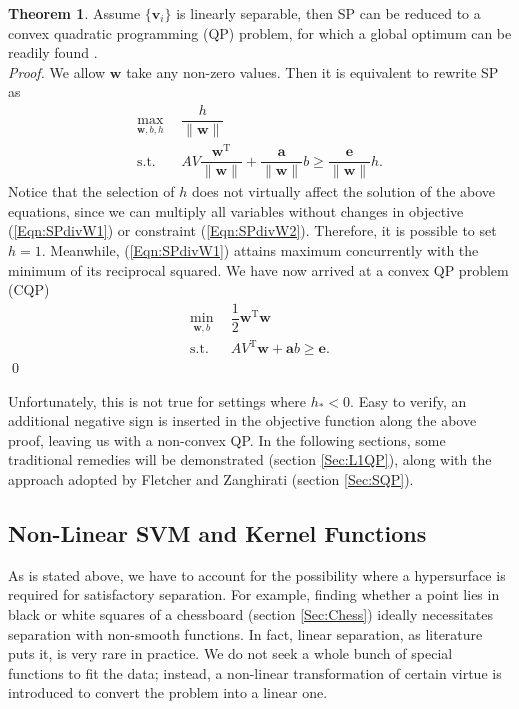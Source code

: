 \documentclass[11pt,a4paper]{article}
\theoremstyle{definition}
\newtheorem{theo}{Theorem}
\renewcommand{\vec}[1]{\boldsymbol{#1}}
\begin{document}
      \begin{theo}\label{Theo:SPcQP}
        Assume $\{\vec{v}_{i}\}$ is linearly separable, then SP can be reduced to a convex quadratic programming (QP) problem, for which a global optimum can be readily found \cite[p.286]{luenberger2008linear}.\\
        \textit{Proof.} We allow $\vec{w}$ take any non-zero values. Then it is equivalent to rewrite SP as
        \begin{align}
          \max_{\vec{w},b,h}~~ & \dfrac{h}{\|\vec{w}\|} \label{Eqn:SPdivW1}\\
           \text{s.t.}~~ & AV\dfrac{\vec{w}^{\mathrm{T}}}{\|\vec{w}\|}+\dfrac{\vec{a}}{\|\vec{w}\|}b\geq\dfrac{\vec{e}}{\|\vec{w}\|}h. \label{Eqn:SPdivW2}
        \end{align}
        Notice that the selection of $h$ does not virtually affect the solution of the above equations, since we can multiply all variables without changes in objective (\ref{Eqn:SPdivW1}) or constraint (\ref{Eqn:SPdivW2}). Therefore, it is possible to set $h=1$. Meanwhile, (\ref{Eqn:SPdivW1}) attains maximum concurrently with the minimum of its reciprocal squared. We have now arrived at a convex QP problem (CQP)
        \begin{align}
          \min_{\vec{w},b}~~ & \dfrac{1}{2}\vec{w}^{\mathrm{T}}\vec{w} \label{Eqn:SPred1}\\
          \text{s.t.}~~ & AV^{\mathrm{T}}\vec{w}+\vec{a}b\geq\vec{e}. \label{Eqn:SPred2}
        \end{align}\qed
      \end{theo}

      Unfortunately, this is not true for settings where $h_{*}<0$. Easy to verify, an additional negative sign is inserted in the objective function along the above proof, leaving us with a non-convex QP. In the following sections, some traditional remedies will be demonstrated (section \ref{Sec:L1QP}), along with the approach adopted by Fletcher and Zanghirati \cite{fletcher2010binary} (section \ref{Sec:SQP}).

    \subsection{Non-Linear SVM and Kernel Functions\label{Sec:NLSVM}}
      As is stated above, we have to account for the possibility where a hypersurface is required for satisfactory separation. For example, finding whether a point lies in black or white squares of a chessboard (section \ref{Sec:Chess}) ideally necessitates separation with non-smooth functions. In fact, linear separation, as literature \cite{fletcher2010binary} puts it, is very rare in practice. We do not seek a whole bunch of special functions to fit the data; instead, a non-linear transformation of certain virtue is introduced to convert the problem into a linear one.
\end{document}
